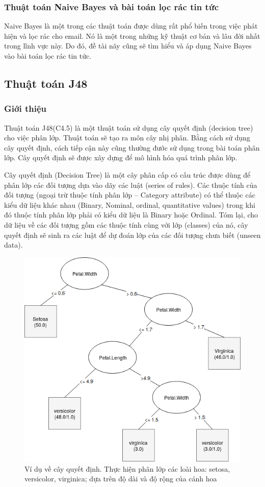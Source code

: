 \subsubsection{Thuật toán Naive Bayes và bài toán lọc rác tin tức}
Naive Bayes là một trong các thuật toán được dùng rất phổ biến trong việc phát hiện và lọc rác cho email. Nó là một trong những kỹ thuật cơ bản và lâu đời nhất trong lĩnh vực này. Do đó, đề tài nãy cũng sẽ tìm hiểu và áp dụng Naive Bayes vào bài toán lọc rác tin tức.

\subsection{Thuật toán J48}
\subsubsection{Giới thiệu}
Thuật toán J48(C4.5) là một thuật toán sử dụng cây quyết định (decision tree) cho việc phân lớp. Thuật toán sẽ tạo ra môn cây nhị phân. Bằng cách sử dụng cây quyết định, cách tiếp cận này cũng thường đước sử dụng trong bài toán phân lớp. Cây quyết định sẽ được xây dựng để mô hình hóa quá trình phân lớp.

Cây quyết định (Decision Tree) là một cây phân cấp có cấu trúc được dùng để phân lớp các đối tượng dựa vào dãy các luật (series of rules). Các thuộc tính của đối tượng (ngoại trừ thuộc tính phân lớp – Category attribute) có thể thuộc các kiểu dữ liệu khác nhau (Binary, Nominal, ordinal, quantitative values) trong khi đó thuộc tính phân lớp phải có kiểu dữ liệu là Binary hoặc Ordinal. Tóm lại, cho dữ liệu về các đối tượng gồm các thuộc tính cùng với lớp (classes) của nó, cây quyết định sẽ sinh ra các luật để dự đoán lớp của các đối tượng chưa biết (unseen data).
\begin{figure}[H]
\centering
\includegraphics[width=0.9\linewidth]{Chapter2/Chapter2Figs/J48.png}
\caption{Ví dụ về cây quyết định. Thực hiện phân lớp các loài hoa: setosa, versicolor, virginica; dựa trên độ dài và độ rộng của cánh hoa}
\end{figure}
